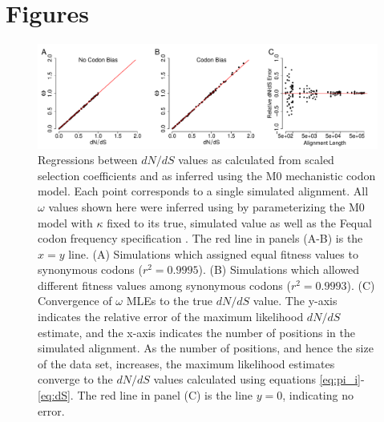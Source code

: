 \documentclass{pnastwo}
\begin{document}
\section*{Figures}

\begin{figure}[htbp]
\centerline{\includegraphics[width=18.7cm]{figures/MainText/regression_convergence.pdf}}
\caption{\label{reg_conv} Regressions between $dN/dS$ values as calculated from scaled selection coefficients and as inferred using the M0 mechanistic codon model. Each point corresponds to a single simulated alignment. All $\omega$ values shown here were inferred using by parameterizing the M0 model with $\kappa$ fixed to its true, simulated value as well as the Fequal codon frequency specification \cite{Yang2006}. The red line in panels (A-B) is the $x=y$ line. (A) Simulations which assigned equal fitness values to synonymous codons ($r^2=0.9995$). (B) Simulations which allowed different fitness values among synonymous codons ($r^2=0.9993$). (C) Convergence of $\omega$ MLEs to the true $dN/dS$ value. The y-axis indicates the relative error of the maximum likelihood $dN/dS$ estimate, and the x-axis indicates the number of positions in the simulated alignment. As the number of positions, and hence the size of the data set, increases, the maximum likelihood estimates converge to the $dN/dS$ values calculated using equations \eqref{eq:pi_i}-\eqref{eq:dS}. The red line in panel (C) is the line $y=0$, indicating no error.}
\end{figure}


\bigskip
\bigskip
\bigskip
\bigskip
\end{document}
